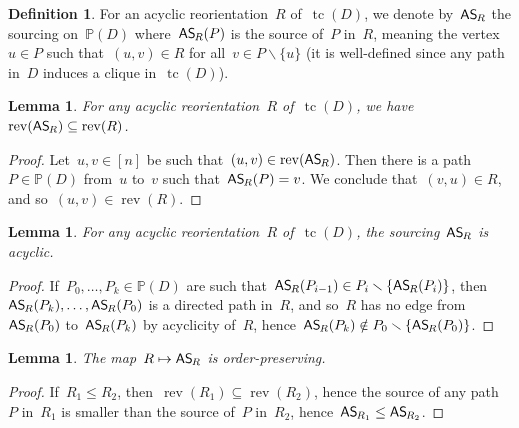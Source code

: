 \documentclass{amsart}
\newtheorem{lemma}[theorem]{Lemma}
\theoremstyle{definition}
\newtheorem{definition}[theorem]{Definition}
\newtheorem{remark}[theorem]{Remark}
\newcommand{\ssm}{\smallsetminus} %
\DeclareMathOperator{\tc}{tc} %
\newcommand{\mymap}[2]{\mathsf{#1}_{\hspace{-.7pt}#2}}
\newcommand{\reori}[1]{\mymap{R}{#1}}  %
\DeclareMathOperator{\rev}{rev} %
\newcommand{\asour}[1]{\mymap{AS}{#1}}  %
\newcommand{\PP}{\mathbb P} %
\begin{document}
\begin{definition}
\label{def:AReori2ASour}
For an acyclic reorientation~$R$ of~$\tc(D)$, we denote by~$\asour{R}$ the sourcing on~$\PP(D)$ where~$\asour{R}(P)$ is the source of~$P$ in~$R$, meaning the vertex~$u \in P$ such that~$(u,v) \in R$ for all~$v \in P \ssm \{u\}$ (it is well-defined since any path in~$D$ induces a clique in~$\tc(D)$).
\end{definition}

\begin{lemma}
\label{lem:AReori2ASour1}
For any acyclic reorientation~$R$ of~$\tc(D)$, we have~$\rev(\asour{R}) \subseteq \rev(R)$.
\end{lemma}

\begin{proof}
Let~$u,v \in [n]$ be such that~$(u,v) \in \rev(\asour{R})$. 
Then there is a path~$P \in \PP(D)$ from~$u$ to~$v$ such that~$\asour{R}(P) = v$.
We conclude that~$(v,u) \in R$, and so~$(u,v) \in \rev(R)$.
\end{proof}

\begin{lemma}
\label{lem:AReori2ASour2}
For any acyclic reorientation~$R$ of~$\tc(D)$, the sourcing~$\asour{R}$ is acyclic.
\end{lemma}

\begin{proof}
If~$P_0, \dots, P_k \in \PP(D)$ are such that~$\asour{R}(P_{i-1}) \in P_i \ssm \{\asour{R}(P_i)\}$, then~$\asour{R}(P_k), \dots, \asour{R}(P_0)$ is a directed path in~$R$, and so~$R$ has no edge from~$\asour{R}(P_0)$ to~$\asour{R}(P_k)$ by acyclicity of~$R$, hence~${\asour{R}(P_k) \notin P_0 \ssm \{\asour{R}(P_0)\}}$.
\end{proof}

\begin{lemma}
\label{lem:AReori2ASour3}
The map~$R \mapsto \asour{R}$ is order-preserving.
\end{lemma}

\begin{proof}
If~$R_1 \le R_2$, then~$\rev(R_1) \subseteq \rev(R_2)$, hence the source of any path~$P$ in~$R_1$ is smaller than the source of~$P$ in~$R_2$, hence~$\asour{R_1} \le \asour{R_2}$.
\end{proof}

\end{document}
